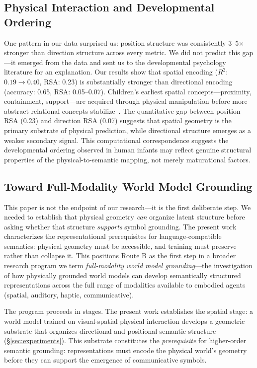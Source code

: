 \documentclass{article}
\begin{document}
\subsection{Physical Interaction and Developmental Ordering}

One pattern in our data surprised us: position structure was consistently
3--5$\times$ stronger than direction structure across every metric.
We did not predict this gap---it emerged from the data and sent us
to the developmental psychology literature for an explanation.
Our results show that spatial encoding ($R^2$: $0.19\!\to\!0.40$, RSA: 0.23)
is substantially stronger than directional encoding (accuracy: 0.65, RSA: 0.05--0.07).
Children's earliest spatial concepts---proximity, containment, support---are
acquired through physical manipulation before more abstract relational concepts
stabilize~\cite{piaget1952origins}.
The quantitative gap between position RSA (0.23) and direction RSA (0.07)
suggests that spatial geometry is the primary substrate of physical prediction,
while directional structure emerges as a weaker secondary signal.
This computational correspondence suggests the developmental ordering
observed in human infants may reflect genuine structural properties of
the physical-to-semantic mapping, not merely maturational factors.

\subsection{Toward Full-Modality World Model Grounding}

This paper is not the endpoint of our research---it is the first
deliberate step. We needed to establish that physical geometry
\emph{can} organize latent structure before asking whether that
structure \emph{supports} symbol grounding.
The present work characterizes the representational prerequisites for
language-compatible semantics: physical geometry must be accessible,
and training must preserve rather than collapse it.
This positions Route B as the first step in a broader research program we term
\emph{full-modality world model grounding}---the investigation of how
physically grounded world models can develop semantically structured
representations across the full range of modalities available to embodied agents
(spatial, auditory, haptic, communicative).

The program proceeds in stages.
The present work establishes the spatial stage:
a world model trained on visual-spatial physical interaction
develops a geometric substrate that organizes
directional and positional semantic structure (\S\ref{sec:experiments}).
This substrate constitutes the \emph{prerequisite} for
higher-order semantic grounding: representations must encode the physical world's
geometry before they can support the emergence of communicative symbols.
\end{document}
